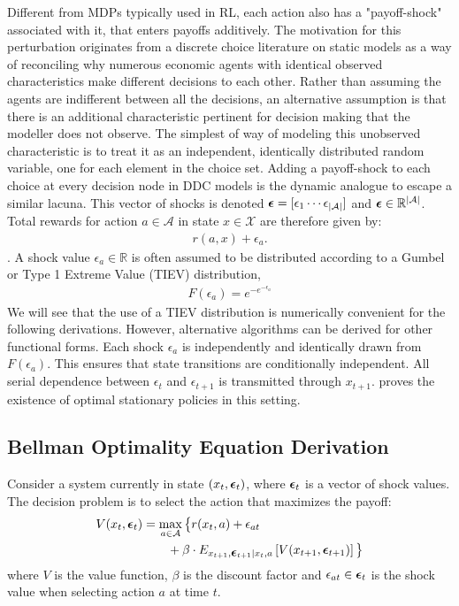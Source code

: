\documentclass{article}
\renewcommand{\vec}[1]{\mbox{\bm{$#1$}}}
\begin{document}
Different from MDPs typically used in RL, each action also has a "payoff-shock" associated with it, that enters payoffs additively.
The motivation for this perturbation originates from a discrete choice literature \cite{mcfadden1973conditional} on static models as a way of reconciling why numerous economic agents with identical observed characteristics make different decisions to each other. Rather than assuming the agents are indifferent between all the decisions,
an alternative assumption is that there is an additional characteristic pertinent for decision making that the modeller does not observe. The simplest of way of modeling this unobserved characteristic is to treat it as an independent, identically distributed random variable, one for each element in the choice set. Adding a payoff-shock to each choice at every decision node in DDC models is the dynamic analogue to escape a similar lacuna.
This vector of shocks is denoted $\vec{\epsilon} = [ \epsilon_{1} \cdots \epsilon_{|\mathcal{A}|} ]$ and $\vec{\epsilon}\in \mathbb{R}^{|\mathcal{A}|}$. Total rewards for action $a \in \mathcal{A}$ in state $x \in \mathcal{X}$ are therefore given by:
\begin{eqnarray}
r(a,x)+\epsilon_a.
\end{eqnarray}
. A shock value $\epsilon_a\in\mathbb{R}$ is often assumed to be distributed according to a Gumbel or Type 1 Extreme Value (TIEV) distribution,
\begin{align}
F(\epsilon_a)=e^{-e^{-\epsilon_a}}
\end{align}
We will see that the use of a TIEV distribution is numerically convenient for the following derivations. However, alternative algorithms can be derived for other functional forms. Each shock $\epsilon_a$ is independently and identically drawn from $F(\epsilon_a)$. This ensures that state transitions are conditionally independent. All serial dependence between $\epsilon_{t}$ and $\epsilon_{t+1}$ is transmitted through $x_{t+1}$. \cite{rust_theory} proves the existence of optimal stationary policies in this setting.

\subsection{Bellman Optimality Equation Derivation}

Consider a system currently in state $(x_t,\vec{\epsilon}_t)$, where $\vec{\epsilon}_t$ is a vector of shock values. The decision problem is to select the action that maximizes the payoff:
\begin{align}
\begin{split}
V(x_t,\vec{\epsilon}_t) & = \max_{a\in\mathcal{A}} \big\{r(x_t,a)+\epsilon_{at} \\
& \qquad + \beta \cdot E_{x_{t+1},\vec{\epsilon}_{t+1}|x_t,a} \left[V(x_{t+1},\vec{\epsilon}_{t+1})\right] \big\} \\
\end{split}
\end{align} 
where $V$ is the value function, $\beta$ is the discount factor and $\epsilon_{at} \in \vec{\epsilon}_t$ is the shock value when selecting action $a$ at time $t$.
\end{document}
